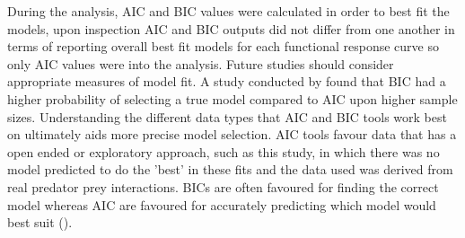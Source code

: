 \documentclass[11pt]{article}
\begin{document}
During the analysis, AIC and BIC values were calculated in order to best fit the models, upon inspection AIC and BIC outputs did not differ from one another in terms of reporting overall best fit models for each functional response curve so only AIC values were into the analysis. Future studies should consider appropriate measures of model fit. A study conducted by \cite{Aho2014} found that BIC had a higher probability of selecting a true model compared to AIC upon higher sample sizes. Understanding the different data types that AIC and BIC tools work best on ultimately aids more precise model selection. AIC tools favour data that has a open ended or exploratory approach, such as this study, in which there was no model predicted to do the 'best' in these fits and the data used was derived from real predator prey interactions. BICs are often favoured for finding the correct model whereas AIC are favoured for accurately predicting which model would best suit (\cite{Aho2014}). 
\end{document}
